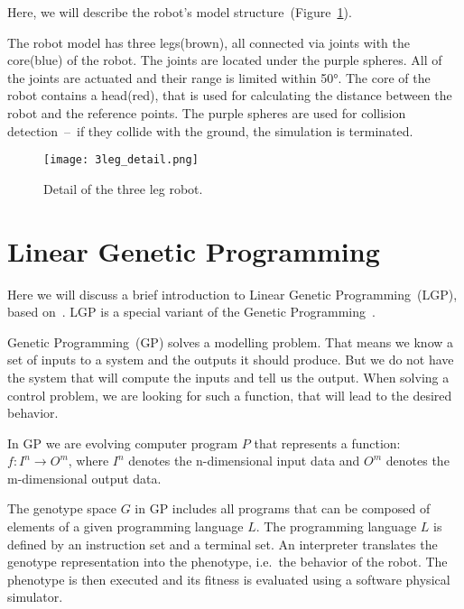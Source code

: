 \documentclass{ExcelAtFIT}
\begin{document}
Here, we will describe the robot's model structure~(Figure~\ref{fig:ThreeLegDetail}).

The robot model has three legs(brown), all connected via joints with the core(blue) of the robot.
The joints are located under the purple spheres.
All of the joints are actuated and their range is limited within \ang{50}.
The core of the robot contains a head(red), that is used for calculating the distance between the robot and the reference points.
The purple spheres are used for collision detection~--~if they collide with the ground, the simulation is terminated.

\begin{figure}[h]
	\centering
	{\texttt{[image: 3leg\_detail.png]}}
	\caption{
	Detail of the three leg robot.
	}
	\label{fig:ThreeLegDetail}
\end{figure}

\section{Linear Genetic Programming}
\label{sec:theory}
Here we will discuss a brief introduction to Linear Genetic Programming~(LGP), based on~\cite{Brameier2010}.
LGP is a special variant of the Genetic Programming~\cite{Koza1992}.

Genetic Programming~(GP) solves a modelling problem.
That means we know a set of inputs to a system and the outputs it should produce.
But we do not have the system that will compute the inputs and tell us the output.
When solving a control problem, we are looking for such a function, that will lead to the desired behavior.

In GP we are evolving computer program $P$ that represents a function: $f : I^n \to O^m$, where $I^n$ denotes the n-dimensional input data and $O^m$ denotes the m-dimensional output data.

The genotype space $G$ in GP includes all programs that can be composed of elements of a given programming language $L$.
The programming language $L$ is defined by an instruction set and a terminal set.
An interpreter translates the genotype representation into the phenotype, i.e.\ the behavior of the robot.
The phenotype is then executed and its fitness is evaluated using a software physical simulator.
\end{document}
